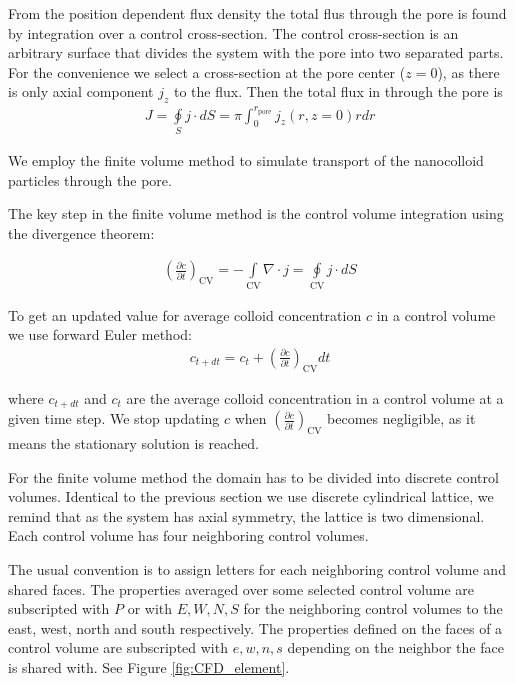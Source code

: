 \documentclass[10pt, a4paper]{article}
\begin{document}
\begin{multicols}{2}
From the position dependent flux density the total flus through the pore is found by integration over a control cross-section.
The control cross-section is an arbitrary surface that divides the system with the pore into two separated parts. 
For the convenience we select a cross-section at the pore center ($z=0$), as there is only axial component $j_z$ to the flux.
Then the total flux in through the pore is
\begin{eqnarray}
    \label{eq:total_flux_1}
    J = \oint\limits_{S} j \cdot dS = \pi \int_0^{r_\textrm{pore}} j_z(r,z=0) r dr
\end{eqnarray}

We employ the finite volume method to simulate transport of the nanocolloid particles through the pore.

The key step in the finite volume method is the control volume integration using the divergence theorem:

\begin{eqnarray}
    \label{eq:CFD_integration_1}
    \left(\frac{\partial c}{\partial t}\right)_{\textrm{CV}}  = -\int\limits_{\textrm{CV}} \nabla \cdot j = \oint\limits_{\textrm{CV}} j \cdot dS
\end{eqnarray}

To get an updated value for average colloid concentration $c$ in a control volume we use forward Euler method:
\begin{eqnarray}
    c_{t+dt} = c_{t} +  \left(\frac{\partial c}{\partial t}\right)_{\textrm{CV}} dt 
\end{eqnarray}

where $c_{t+dt}$ and $c_{t}$ are the average colloid concentration in a control volume at a given time step.
We stop updating $c$ when $\left(\frac{\partial c}{\partial t}\right)_{\textrm{CV}}$ becomes negligible, as it means the stationary solution is reached.

For the finite volume method the domain has to be divided into discrete control volumes.
Identical to the previous section we use discrete cylindrical lattice, we remind that as the system has axial symmetry, the lattice is two dimensional.
Each control volume has four neighboring control volumes.

The usual convention is to assign letters for each neighboring control volume and shared faces. The properties averaged over some selected control volume are subscripted with $P$ or with $E, W, N, S$ for the neighboring control volumes to the east, west, north and south respectively. The properties defined on the faces of a control volume are subscripted with $e, w, n, s$ depending on the neighbor the face is shared with. See Figure \ref{fig:CFD_element}.


\end{multicols}
\end{document}

